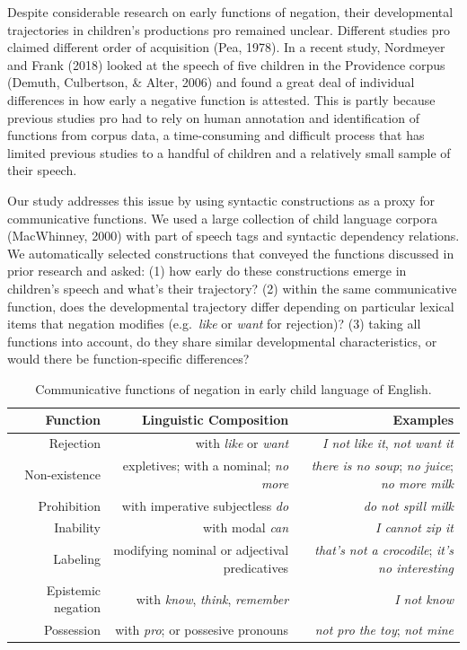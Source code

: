 \documentclass[
  english,
  man,floatsintext]{apa6}
\begin{document}
Despite considerable research on early functions of negation, their developmental trajectories in children's productions pro remained unclear. Different studies pro claimed different order of acquisition (Pea, 1978). In a recent study, Nordmeyer and Frank (2018) looked at the speech of five children in the Providence corpus (Demuth, Culbertson, \& Alter, 2006) and found a great deal of individual differences in how early a negative function is attested. This is partly because previous studies pro had to rely on human annotation and identification of functions from corpus data, a time-consuming and difficult process that has limited previous studies to a handful of children and a relatively small sample of their speech.

Our study addresses this issue by using syntactic constructions as a proxy for communicative functions. We used a large collection of child language corpora (MacWhinney, 2000) with part of speech tags and syntactic dependency relations. We automatically selected constructions that conveyed the functions discussed in prior research and asked: (1) how early do these constructions emerge in children's speech and what's their trajectory? (2) within the same communicative function, does the developmental trajectory differ depending on particular lexical items that negation modifies (e.g.~\emph{like} or \emph{want} for rejection)? (3) taking all functions into account, do they share similar developmental characteristics, or would there be function-specific differences?

\begin{table}[h!]
\small
\centering
\begin{tabular}{rrr}
  \hline
 \textbf{Function} & \textbf{Linguistic Composition} & \textbf{Examples} \\
  \hline
Rejection & with \textit{like} or \textit{want} & \textit{I not like it}, \textit{not want it}  \\
Non-existence & expletives; with a nominal; \textit{no more} & \textit{there is no soup}; \textit{no juice}; \textit{no more milk} \\
Prohibition & with imperative subjectless \textit{do} & \textit{do not spill milk} \\
Inability & with modal \textit{can} & \textit{I cannot zip it} \\
Labeling & modifying nominal or adjectival predicatives & \textit{that's not a crocodile}; \textit{it's no interesting} \\
Epistemic negation & with \textit{know}, \textit{think}, \textit{remember}  & \textit{I not know} \\
Possession & with \textit{pro}; or possesive pronouns & \textit{not pro the toy}; \textit{not mine} \\
   \hline
\end{tabular}
\caption{Communicative functions of negation in early child language of English.}
\end{table}
\end{document}
